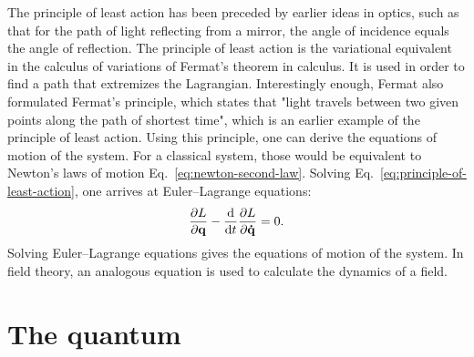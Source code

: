 The principle of least action has been preceded by earlier ideas in optics, such as that for the path of light reflecting from a mirror, the angle of incidence equals the angle of reflection. The principle of least action is the variational equivalent in the calculus of variations of Fermat's theorem in calculus. It is used in order to find a path that extremizes the Lagrangian. Interestingly enough, Fermat also formulated Fermat's principle, which states that "light travels between two given points along the path of shortest time", which is an earlier example of the principle of least action. Using this principle, one can derive the equations of motion of the system. For a classical system, those would be equivalent to  Newton's laws of motion Eq.~\ref{eq:newton-second-law}. Solving Eq.~\ref{eq:principle-of-least-action}, one arrives at Euler–Lagrange equations:
\begin{equation}
\pdv{L}{\vb{q}}-\dv{t}\pdv{L}{\vb{\dot{q}}}=0.
\end{equation}
Solving Euler–Lagrange equations gives the equations of motion of the system. In field theory, an analogous equation is used to calculate the dynamics of a field.

\section{The quantum}
\label{sec:quantum}

